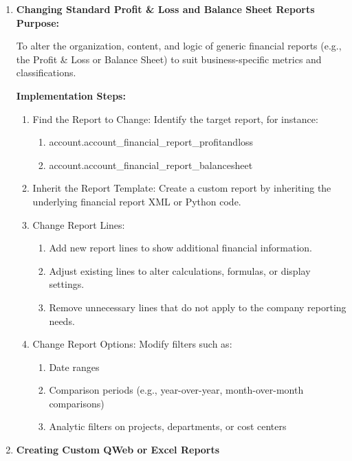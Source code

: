 \documentclass[11pt,a4paper]{article}
\begin{document}
\begin{enumerate}
    \item \textbf{Changing Standard Profit \& Loss and Balance Sheet Reports}
    \textbf{Purpose:}

    To alter the organization, content, and logic of generic financial reports (e.g., the Profit \& Loss or Balance Sheet) to suit business-specific metrics and classifications.
    \medskip

    \textbf{Implementation Steps:}
    \begin{enumerate}
        \item Find the Report to Change: Identify the target report, for instance:
        \begin{enumerate}
            \item account.account\_financial\_report\_profitandloss
            \item account.account\_financial\_report\_balancesheet
        \end{enumerate}
        \item Inherit the Report Template: Create a custom report by inheriting the underlying financial report XML or Python code.
        \item Change Report Lines:
        \begin{enumerate}
            \item Add new report lines to show additional financial information.
            \item Adjust existing lines to alter calculations, formulas, or display settings.
            \item Remove unnecessary lines that do not apply to the company reporting needs.
        \end{enumerate}
        \item Change Report Options: Modify filters such as:
        \begin{enumerate}
            \item Date ranges
            \item Comparison periods (e.g., year-over-year, month-over-month comparisons)
            \item Analytic filters on projects, departments, or cost centers
        \end{enumerate}
    \end{enumerate}
    \medskip

    \newpage
    \item \textbf{Creating Custom QWeb or Excel Reports}
    

\end{enumerate}
\end{document}
